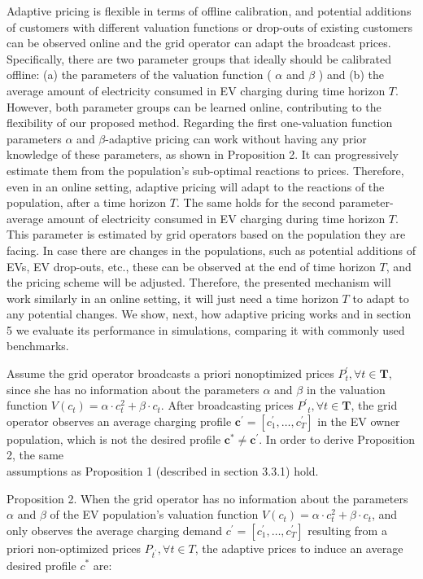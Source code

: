 \documentclass[10pt]{article}
\begin{document}
Adaptive pricing is flexible in terms of offline calibration, and potential additions of customers with different valuation functions or drop-outs of existing customers can be observed online and the grid operator can adapt the broadcast prices. Specifically, there are two parameter groups that ideally should be calibrated offline: (a) the parameters of the valuation function ( $\alpha$ and $\beta$ ) and (b) the average amount of electricity consumed in EV charging during time horizon $T$. However, both parameter groups can be learned online, contributing to the flexibility of our proposed method. Regarding the first one-valuation function parameters $\alpha$ and $\beta$-adaptive pricing can work without having any prior knowledge of these parameters, as shown in Proposition 2. It can progressively estimate them from the population's sub-optimal reactions to prices. Therefore, even in an online setting, adaptive pricing will adapt to the reactions of the population, after a time horizon $T$. The same holds for the second parameter-average amount of electricity consumed in EV charging during time horizon $T$. This parameter is estimated by grid operators based on the population they are facing. In case there are changes in the populations, such as potential additions of EVs, EV drop-outs, etc., these can be observed at the end of time horizon $T$, and the pricing scheme will be adjusted. Therefore, the presented mechanism will work similarly in an online setting, it will just need a time horizon $T$ to adapt to any potential changes. We show, next, how adaptive pricing works and in section 5 we evaluate its performance in simulations, comparing it with commonly used benchmarks.

Assume the grid operator broadcasts a priori nonoptimized prices $P_{t}^{\prime}, \forall t \in \mathbf{T}$, since she has no information about the parameters $\alpha$ and $\beta$ in the valuation function $V\left(c_{t}\right)=\alpha \cdot c_{t}^{2}+\beta \cdot c_{t}$. After broadcasting prices $P^{\prime}{ }_{t}, \forall t \in \mathbf{T}$, the grid operator observes an average charging profile $\mathbf{c}^{\prime}=\left[c_{1}^{\prime}, \ldots, c_{T}^{\prime}\right]$ in the EV owner population, which is not the desired profile $\mathbf{c}^{*} \neq \mathbf{c}^{\prime}$. In order to derive Proposition 2, the same\\
assumptions as Proposition 1 (described in section 3.3.1) hold.

Proposition 2. When the grid operator has no information about the parameters $\alpha$ and $\beta$ of the EV population's valuation function $V\left(c_{t}\right)=\alpha \cdot c_{t}^{2}+\beta \cdot c_{t}$, and only observes the average charging demand $c^{\prime}=\left[c_{1}^{\prime}, \ldots, c_{T}^{\prime}\right]$ resulting from a priori non-optimized prices $P_{t^{\prime}}, \forall t \in T$, the adaptive prices to induce an average desired profile $c^{*}$ are:
\end{document}
